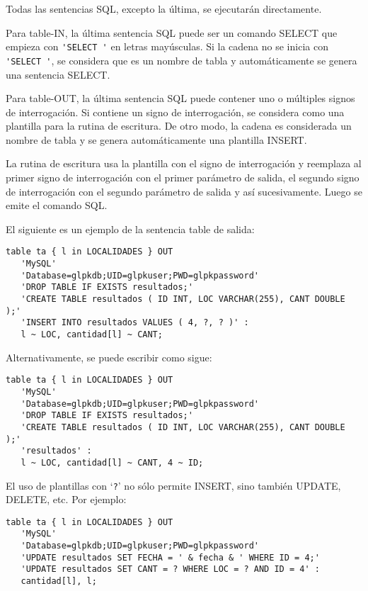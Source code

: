 \documentclass[11pt,spanish]{report}
\begin{document}
Todas las sentencias SQL, excepto la última, se ejecutarán directamente.

Para table-IN, la última sentencia SQL puede ser un comando SELECT que empieza con \verb|'SELECT '| en letras mayúsculas. Si la cadena no se inicia con \verb|'SELECT '|, se considera que es un nombre de tabla y automáticamente se genera una sentencia SELECT.

Para table-OUT, la última sentencia SQL puede contener uno o múltiples signos de interrogación. Si contiene un signo de interrogación, se considera como una plantilla para la rutina de escritura. De otro modo, la cadena es considerada un nombre de tabla y se genera automáticamente una plantilla INSERT.

La rutina de escritura usa la plantilla con el signo de interrogación y reemplaza al primer signo de interrogación con el primer parámetro de salida, el segundo signo de interrogación con el segundo parámetro de salida y así sucesivamente. Luego se emite el comando SQL.

El siguiente es un ejemplo de la sentencia table de salida:

\newpage

\begin{verbatim}
table ta { l in LOCALIDADES } OUT
   'MySQL'
   'Database=glpkdb;UID=glpkuser;PWD=glpkpassword'
   'DROP TABLE IF EXISTS resultados;'
   'CREATE TABLE resultados ( ID INT, LOC VARCHAR(255), CANT DOUBLE );'
   'INSERT INTO resultados VALUES ( 4, ?, ? )' :
   l ~ LOC, cantidad[l] ~ CANT;
\end{verbatim}

\noindent
Alternativamente, se puede escribir como sigue:

\begin{verbatim}
table ta { l in LOCALIDADES } OUT
   'MySQL'
   'Database=glpkdb;UID=glpkuser;PWD=glpkpassword'
   'DROP TABLE IF EXISTS resultados;'
   'CREATE TABLE resultados ( ID INT, LOC VARCHAR(255), CANT DOUBLE );'
   'resultados' :
   l ~ LOC, cantidad[l] ~ CANT, 4 ~ ID;
\end{verbatim}

El uso de plantillas con `\verb|?|' no sólo permite INSERT, sino también UPDATE, DELETE, etc. Por ejemplo:

\begin{verbatim}
table ta { l in LOCALIDADES } OUT
   'MySQL'
   'Database=glpkdb;UID=glpkuser;PWD=glpkpassword'
   'UPDATE resultados SET FECHA = ' & fecha & ' WHERE ID = 4;'
   'UPDATE resultados SET CANT = ? WHERE LOC = ? AND ID = 4' :
   cantidad[l], l;
\end{verbatim}
\end{document}
